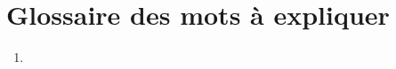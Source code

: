 \documentclass[../main.tex]{subfiles}
\begin{document}
\section{Glossaire des mots à expliquer}
\begin{enumerate}
    \item 
\end{enumerate}
    
    
\end{document}
